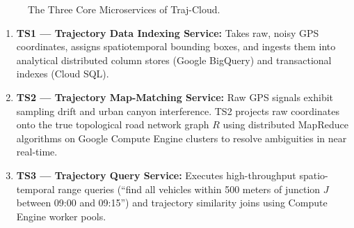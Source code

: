 \documentclass[11pt,a4paper,openany]{report}
\begin{document}
\begin{figure}[H]
\centering
{}
\caption{The Three Core Microservices of Traj-Cloud.}
\end{figure}

\begin{enumerate}[leftmargin=*]
  \item \textbf{TS1 --- Trajectory Data Indexing Service:} Takes raw, noisy GPS coordinates, assigns spatiotemporal bounding boxes, and ingests them into analytical distributed column stores (Google BigQuery) and transactional indexes (Cloud SQL).
  \item \textbf{TS2 --- Trajectory Map-Matching Service:} Raw GPS signals exhibit sampling drift and urban canyon interference. TS2 projects raw coordinates onto the true topological road network graph $R$ using distributed MapReduce algorithms on Google Compute Engine clusters to resolve ambiguities in near real-time.
  \item \textbf{TS3 --- Trajectory Query Service:} Executes high-throughput spatio-temporal range queries (``find all vehicles within 500 meters of junction $J$ between 09:00 and 09:15'') and trajectory similarity joins using Compute Engine worker pools.
\end{enumerate}
\end{document}
